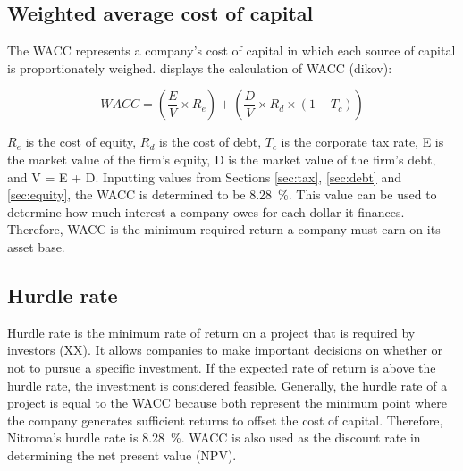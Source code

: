 \subsection{Weighted average cost of capital}
\label{sec:wacc}
The WACC represents a company’s cost of capital in which each source of capital is proportionately weighed.  displays the calculation of WACC (dikov):

\begin{equation}
\label{eqn:wacc}
    WACC=\left(\frac{E}{V}\times R_{e}\right)+\left(\frac{D}{V}\times R_{d}\times (1-T_{c})\right)
\end{equation}

$R_{e}$ is the cost of equity, $R_{d}$ is the cost of debt, $T_{c}$ is the corporate tax rate, E is the market value of the firm’s equity, D is the market value of the firm’s debt, and V = E + D. Inputting values from Sections \ref{sec:tax}, \ref{sec:debt} and \ref{sec:equity}, the WACC is determined to be \SI{8.28}{\percent}. This value can be used to determine how much interest a company owes for each dollar it finances. Therefore, WACC is the minimum required return a company must earn on its asset base. 

\subsection{Hurdle rate}
Hurdle rate is the minimum rate of return on a project that is required by investors (XX). It allows companies to make important decisions on whether or not to pursue a specific investment. If the expected rate of return is above the hurdle rate, the investment is considered feasible. Generally, the hurdle rate of a project is equal to the WACC because both represent the minimum point where the company generates sufficient returns to offset the cost of capital. Therefore, Nitroma's hurdle rate is \SI{8.28}{\percent}. WACC is also used as the discount rate in determining the net present value (NPV).